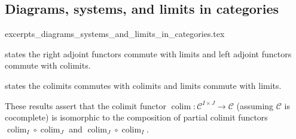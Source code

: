 










\subsection{Diagrams, systems, and limits in categories}

{excerpts_diagrams_systems_and_limits_in_categories.tex}



 states the right adjoint functors commute with limits and left adjoint functors commute with colimits.









 states the colimits commutes with colimits and limits commute with limits.



\begin{remark}
    These results assert that the colimit functor $\operatorname{colim}: \mathcal{C}^{I \times J} \to \mathcal{C}$ (assuming $\mathcal{C}$ is cocomplete) is isomorphic to the composition of partial colimit functors $\operatorname{colim}_I \circ \operatorname{colim}_J$ and $\operatorname{colim}_J \circ \operatorname{colim}_I$.
\end{remark}

